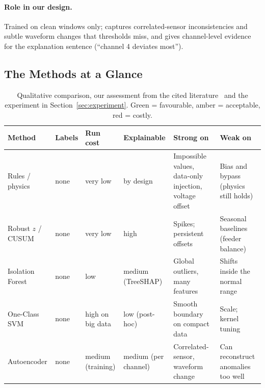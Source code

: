 \documentclass[11pt,a4paper]{article}
\begin{document}
\paragraph{Role in our design.} Trained on clean windows only; captures correlated-sensor inconsistencies and
subtle waveform changes that thresholds miss, and gives channel-level evidence for the explanation sentence
(``channel 4 deviates most'').

\subsection{The Methods at a Glance}
\begin{table}[H]
\centering
\small
\renewcommand{\arraystretch}{1.15}
\begin{tabularx}{\textwidth}{@{}>{\raggedright\arraybackslash}p{2.3cm}>{\raggedright\arraybackslash}p{1.2cm}>{\raggedright\arraybackslash}p{1.8cm}>{\raggedright\arraybackslash}p{2.2cm}LL@{}}
\toprule
\textbf{Method} & \textbf{Labels} & \textbf{Run cost} & \textbf{Explainable} & \textbf{Strong on} & \textbf{Weak on} \\
\midrule
Rules / physics & none & very low & by design & Impossible values, data-only injection, voltage offset & Bias and bypass (physics still holds) \\
Robust $z$ / CUSUM & none & very low & high & Spikes; persistent offsets & Seasonal baselines (feeder balance) \\
Isolation Forest & none & low & medium (TreeSHAP) & Global outliers, many features & Shifts inside the normal range \\
One-Class SVM & none & high on big data & low (post-hoc) & Smooth boundary on compact data & Scale; kernel tuning \\
Autoencoder & none & medium (training) & medium (per channel) & Correlated-sensor, waveform change & Can reconstruct anomalies too well \\
\bottomrule
\end{tabularx}
\caption{Qualitative comparison, our assessment from the cited literature~\cite{chandola,pang} and the
experiment in Section~\ref{sec:experiment}. Green = favourable, amber = acceptable, red = costly.}
\label{tab:glance}
\end{table}
\end{document}
